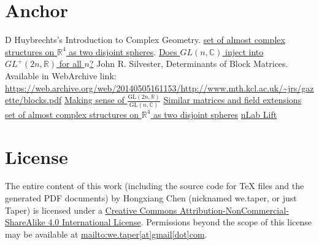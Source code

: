 \documentclass{article}
\numberwithin{equation}{subsection} %
\theoremstyle{definition}
\begin{document}
\section{Anchor}
\label{sec:Anchor}

\begin{thebibliography}{1}
   D Huybrechts's Introduction to Complex Geometry.
   \href{http://math.stackexchange.com/questions/923957/set-of-almost-complex-structures-on-mathbb-r4-as-two-disjoint-spheres}{set of almost complex structures on $\mathbb{R}^4$ as two disjoint spheres}.
   \href{http://math.stackexchange.com/questions/1356823/does-gln-mathbbc-inject-into-gl2n-mathbbr-for-all-n}{Does $GL(n,\mathbb{C})$ inject into $GL^+(2n, \mathbb{R})$ for all $n$?}
   John R. Silvester, 
      Determinants of Block Matrices. Available in WebArchive link:
      \url{https://web.archive.org/web/20140505161153/http://www.mth.kcl.ac.uk/~jrs/gazette/blocks.pdf}
   \href{http://math.stackexchange.com/questions/1927487/making-sense-of-frac-mathrmgl2n-mathbbr-mathrmgln-mathbbc/1927518?noredirect=1#comment3957369_1927518}{Making sense of $\frac{\mathrm{GL}(2n,\mathbb{R})}{\mathrm{GL}(n,\mathbb{C})}$}
   \href{http://math.stackexchange.com/questions/57242/similar-matrices-and-field-extensions?noredirect=1&lq=1}
  {Similar matrices and field extensions}
   \href{http://math.stackexchange.com/questions/923957/set-of-almost-complex-structures-on-mathbb-r4-as-two-disjoint-spheres}{set of almost complex structures on $\mathbb{R}^4$ as two disjoint spheres}
  \href{https://ncatlab.org/nlab/show/lift}{nLab Lift}
\end{thebibliography}
\printnomenclature


\section{License}
The entire content of this work (including the source code
for TeX files and the generated PDF documents) by 
Hongxiang Chen (nicknamed we.taper, or just Taper) is
licensed under a 
\href{http://creativecommons.org/licenses/by-nc-sa/4.0/}{Creative 
Commons Attribution-NonCommercial-ShareAlike 4.0 International 
License}. Permissions beyond the scope of this 
license may be available at \url{mailto:we.taper[at]gmail[dot]com}.
\end{document}
